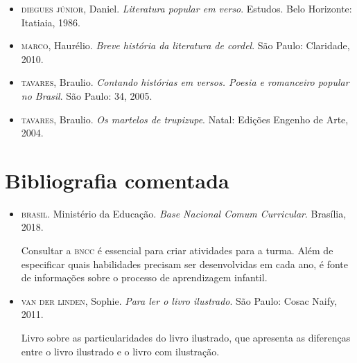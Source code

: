 \documentclass[11pt]{extarticle}
\begin{document}
\begin{itemize}
\item \textsc{diegues júnior}, Daniel. \textit{Literatura popular em verso}. Estudos. Belo Horizonte: Itatiaia, 1986. 

\item \textsc{marco}, Haurélio. \textit{Breve história da literatura de cordel}. São Paulo: Claridade, 2010.

\item \textsc{tavares}, Braulio. \textit{Contando histórias em versos. Poesia e romanceiro popular no Brasil}. São Paulo: 34, 2005.

\item \textsc{tavares}, Braulio. \textit{Os martelos de trupizupe}. Natal: Edições Engenho de Arte, 2004.
\end{itemize}

\section{Bibliografia comentada}

\begin{itemize}
\item \textsc{brasil}. Ministério da Educação. \textit{Base Nacional Comum Curricular}. Brasília, 2018.

Consultar a \textsc{bncc} é essencial para criar atividades para a turma. Além de especificar 
quais habilidades precisam ser desenvolvidas em cada ano, é fonte de informações sobre 
o processo de aprendizagem infantil. 

 
\item \textsc{van der linden}, Sophie. \textit{Para ler o livro ilustrado}. São Paulo: Cosac Naify, 2011.

Livro sobre as particularidades do livro ilustrado, que apresenta as diferenças entre o livro ilustrado e o livro com ilustração. 
\end{itemize}
\end{document}
